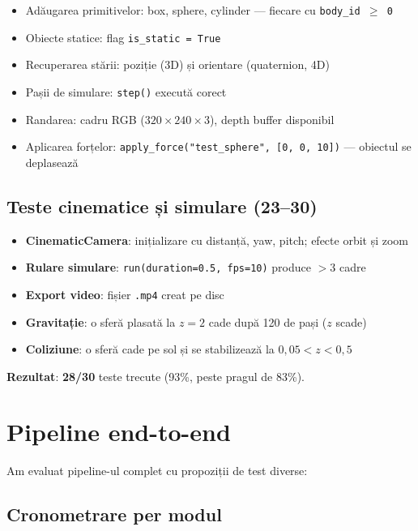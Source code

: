 \begin{itemize}
    \item Adăugarea primitivelor: box, sphere, cylinder --- fiecare cu \texttt{body\_id $\geq$ 0}
    \item Obiecte statice: flag \texttt{is\_static = True}
    \item Recuperarea stării: poziție (3D) și orientare (quaternion, 4D)
    \item Pașii de simulare: \texttt{step()} execută corect
    \item Randarea: cadru RGB ($320 \times 240 \times 3$), depth buffer disponibil
    \item Aplicarea forțelor: \texttt{apply\_force("test\_sphere", [0, 0, 10])} --- obiectul se deplasează
\end{itemize}

\subsection{Teste cinematice și simulare (23--30)}

\begin{itemize}
    \item \textbf{CinematicCamera}: inițializare cu distanță, yaw, pitch; efecte orbit și zoom
    \item \textbf{Rulare simulare}: \texttt{run(duration=0.5, fps=10)} produce $>$3 cadre
    \item \textbf{Export video}: fișier \texttt{.mp4} creat pe disc
    \item \textbf{Gravitație}: o sferă plasată la $z = 2$ cade după 120 de pași ($z$ scade)
    \item \textbf{Coliziune}: o sferă cade pe sol și se stabilizează la $0{,}05 < z < 0{,}5$
\end{itemize}

\textbf{Rezultat}: \textbf{28/30} teste trecute (93\%, peste pragul de 83\%).

\section{Pipeline end-to-end}
\label{sec:e2e}

Am evaluat pipeline-ul complet cu propoziții de test diverse:

\subsection{Cronometrare per modul}

